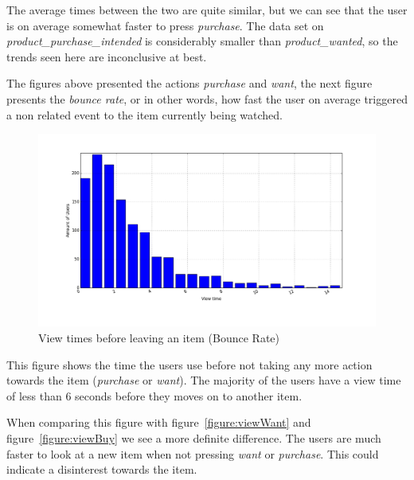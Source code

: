         The average times between the two are quite similar, but we can see that the user is on average somewhat faster to press \emph{purchase}.
        The data set on \emph{product\_purchase\_intended} is considerably smaller than \emph{product\_wanted}, so the trends seen here are inconclusive at best.

        The figures above presented the actions \emph{purchase} and \emph{want}, the next figure presents the \emph{bounce rate}, or in other words, how fast the user on average triggered a non related event to the item currently being watched.
    \begin{figure}[H]
        \includegraphics[width=5in]{image/product_detail_clickeddistribution.png}
        \centering
        \caption{View times before leaving an item (Bounce Rate)}
    \label{figure:bounceRate}
    \end{figure}
        This figure shows the time the users use before not taking any more action towards the item (\emph{purchase} or \emph{want}).
        The majority of the users have a view time of less than 6 seconds before they moves on to another item.

        When comparing this figure with figure~\ref{figure:viewWant} and figure~\ref{figure:viewBuy} we see a more definite difference.
        The users are much faster to look at a new item when not pressing \emph{want} or \emph{purchase}.
        This could indicate a disinterest towards the item.

